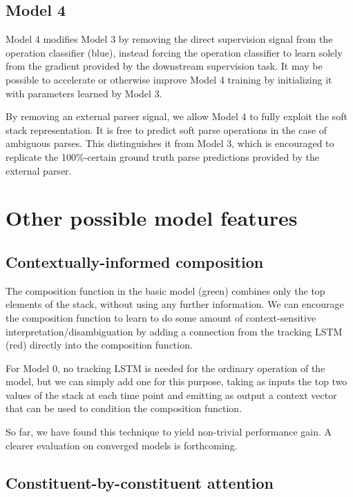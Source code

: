 \documentclass[11pt,letterpaper]{article}
\begin{document}
\subsection{Model 4}

Model 4 modifies Model 3 by removing the direct supervision signal from the operation classifier (blue), instead forcing the operation classifier to learn solely from the gradient provided by the downstream supervision task. It may be possible to accelerate or otherwise improve Model 4 training by initializing it with parameters learned by Model 3.

By removing an external parser signal, we allow Model 4 to fully exploit the soft stack representation. It is free to predict soft parse operations in the case of ambiguous parses. This distinguishes it from Model 3, which is encouraged to replicate the 100\%-certain ground truth parse predictions provided by the external parser.

\section{Other possible model features}

\subsection{Contextually-informed composition}

The composition function in the basic model (green) combines only the top elements of the stack, without using any further information. We can encourage the composition function to learn to do some amount of context-sensitive interpretation/disambiguation by adding a connection from the tracking LSTM (red) directly into the composition function.

For Model 0, no tracking LSTM is needed for the ordinary operation of the model, but we can simply add one for this purpose, taking as inputs the top two values of the stack at each time point and emitting as output a context vector that can be used to condition the composition function.

So far, we have found this technique to yield non-trivial performance gain. A clearer evaluation on converged models is forthcoming.

\subsection{Constituent-by-constituent attention}\label{sec:c-by-c}
\end{document}
